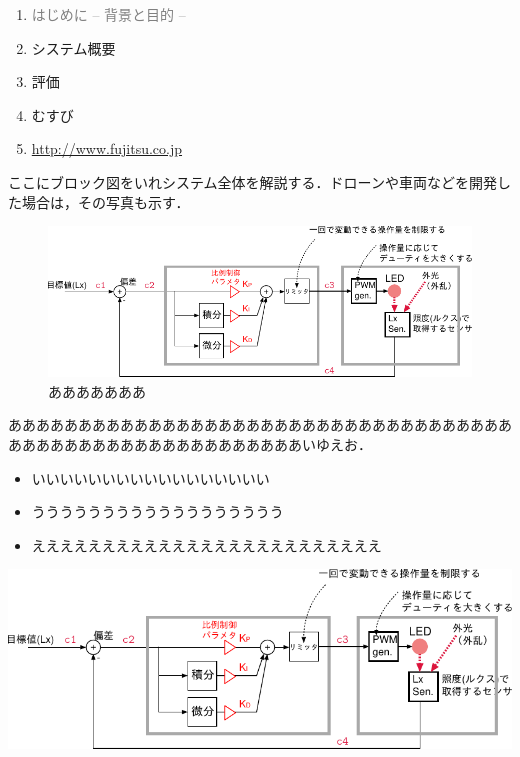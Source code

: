 \begin{enumerate}[itemsep=0.25zh]
	\item \textcolor{gray}{はじめに -- 背景と目的 --}
	\item システム概要
	\item 評価
	\item むすび
    \item \url{http://www.fujitsu.co.jp}
\end{enumerate}
\newpage


ここにブロック図をいれシステム全体を解説する．ドローンや車両などを開発した場合は，その写真も示す．
\begin{figure}[h]
\begin{center}
\includegraphics[width=\textwidth]{fig/system.pdf}
\caption{あああああああ}
\end{center}
\end{figure}
\newpage

\begin{minipage}[t]{0.4\textwidth}\vspace{0pt}
あああああああああああああああああああああああああああああああああああああああああああああああああああああああああいゆえお．
\begin{itemize}[parsep=-0.5zh]
	\item いいいいいいいいいいいいいいいいい
	\item うううううううううううううううううう
	\item えええええええええええええええええええええええええ
\end{itemize}
\end{minipage}
\begin{minipage}[t]{0.6\textwidth}\vspace{0pt}
\begin{center}
\includegraphics[keepaspectratio, width=.9\linewidth,trim={100mm 0mm 0mm 15mm},clip]{fig/system.pdf}
\end{center}
\end{minipage}


